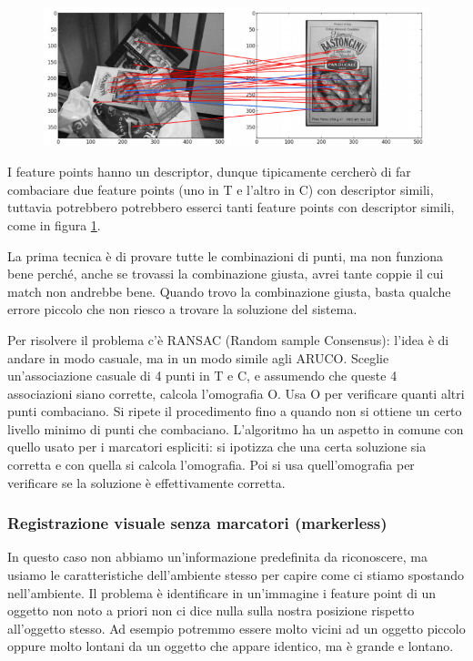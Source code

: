 \begin{figure}[!ht]
    \centering
    \includegraphics[width=\textwidth]{images/MobiDEV/3. augmented reality/pattern matching.PNG}
    \caption{}
    \label{fig:pattern matching}
\end{figure}

I feature points hanno un descriptor, dunque tipicamente cercherò di far combaciare due feature points (uno in T e l'altro in C) con descriptor simili, tuttavia potrebbero potrebbero esserci tanti feature points con descriptor simili, come in figura \ref{fig:pattern matching}. 

La prima tecnica è di provare tutte le combinazioni di punti, ma non funziona bene perché, anche se trovassi la combinazione giusta, avrei tante coppie il cui match non andrebbe bene. 
Quando trovo la combinazione giusta, basta qualche errore piccolo che non riesco a trovare la soluzione del sistema. 

Per risolvere il problema c'è RANSAC (Random sample Consensus): l'idea è di andare in modo casuale, ma in un modo simile agli ARUCO. 
Sceglie un'associazione casuale di 4 punti in T e C, e assumendo che queste 4 associazioni siano corrette, calcola l'omografia O. 
Usa O per verificare quanti altri punti combaciano.
Si ripete il procedimento fino a quando non si ottiene un certo livello minimo di punti che combaciano. 
L'algoritmo ha un aspetto in comune con quello usato per i marcatori espliciti: si ipotizza che una certa soluzione sia corretta e con quella si calcola l'omografia. Poi si usa quell'omografia per verificare se la soluzione è effettivamente corretta.


\subsubsection{Registrazione visuale senza marcatori (markerless)}
In questo caso non abbiamo un'informazione predefinita da riconoscere, ma usiamo le caratteristiche dell'ambiente stesso per capire come ci stiamo spostando nell'ambiente.
Il problema è identificare in un'immagine i feature point di un oggetto non noto a priori non ci dice nulla sulla nostra posizione rispetto all'oggetto stesso. 
Ad esempio potremmo essere molto vicini ad un oggetto piccolo oppure molto lontani da un oggetto che appare identico, ma è grande e lontano.


